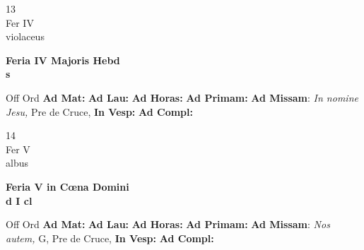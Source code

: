 \documentclass[10pt, openany]{book}
\begin{document}
    \begin{center}
        \begin{minipage}{3.5in}
            \vspace{2em}
            \begin{minipage}{0.5in}
                {\Huge 13} \\
                {\normalsize Fer IV} \\
                {\normalsize violaceus}
            \end{minipage}
            \begin{minipage}{3.0in}
                \textbf{ \large Feria IV Majoris Hebd \\
                \textnormal{\normalsize s}} \\ 
            \end{minipage}
            \begin{justify}Off Ord
                \textbf{Ad Mat: }
                \textbf{Ad Lau: }
                \textbf{Ad Horas: }
                \textbf{Ad Primam: }\textbf{Ad Missam}: \textit{In nomine Jesu,} Pre de Cruce,  
                \textbf{In Vesp: }
                \textbf{Ad Compl: }
            \end{justify}
        \end{minipage}
    \end{center}

    \begin{center}
        \begin{minipage}{3.5in}
            \vspace{2em}
            \begin{minipage}{0.5in}
                {\Huge 14} \\
                {\normalsize Fer V} \\
                {\normalsize albus}
            \end{minipage}
            \begin{minipage}{3.0in}
                \textbf{ \large Feria V in Cœna Domini \\
                \textnormal{\normalsize d I cl}} \\ 
            \end{minipage}
            \begin{justify}Off Ord
                \textbf{Ad Mat: }
                \textbf{Ad Lau: }
                \textbf{Ad Horas: }
                \textbf{Ad Primam: }\textbf{Ad Missam}: \textit{Nos autem,} G, Pre de Cruce,  
                \textbf{In Vesp: }
                \textbf{Ad Compl: }
            \end{justify}
        \end{minipage}
    \end{center}
\end{document}
